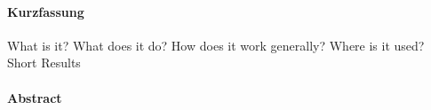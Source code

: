 \cleardoublepage

\begin{center}
\paragraph{Kurzfassung}
\hrulefill
\end{center}
What is it? \newline
What does it do?\newline
How does it work generally?\newline
Where is it used? \newline
Short Results\newline
\vspace {2cm}
\begin{center}
\paragraph{Abstract}
\hrulefill
\end{center}